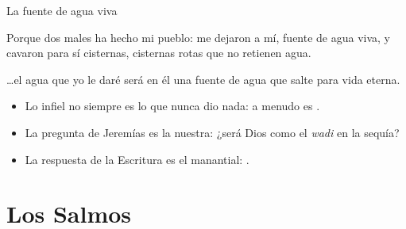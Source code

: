 \begin{frame}{La fuente de agua viva}
\begin{cita}Porque dos males ha hecho mi pueblo: me dejaron a mí, fuente de agua viva, y cavaron para sí cisternas, cisternas rotas que no retienen agua.\end{cita}
\begin{cita}\ldots{}el agua que yo le daré será en él una fuente de agua que salte para vida eterna.\end{cita}
\small
\begin{itemize}
\item Lo infiel no siempre es lo que nunca dio nada: a menudo es .
\item La pregunta de Jeremías es la nuestra: ¿será Dios como el \emph{wadi} en la sequía?
\item La respuesta de la Escritura es el manantial: .
\end{itemize}
\end{frame}

\section{Los Salmos}


